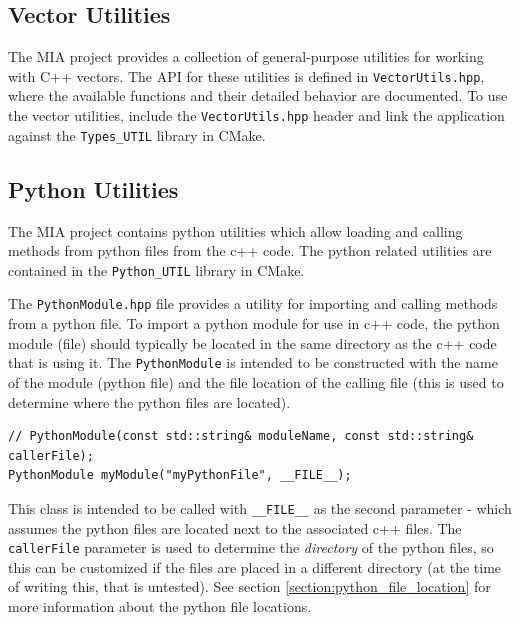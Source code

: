 \subsection{Vector Utilities}\label{section:vector_utils}

The MIA project provides a collection of general-purpose utilities for working with C++ vectors. The API for these utilities is defined in \texttt{VectorUtils.hpp}, where the available functions and their detailed behavior are documented. To use the vector utilities, include the \texttt{VectorUtils.hpp} header and link the application against the \texttt{Types\_UTIL} library in CMake.
















\subsection{Python Utilities}\label{section:python_utils}

The MIA project contains python utilities which allow loading and calling methods from python files from the c++ code. The python related utilities are contained in the \texttt{Python\_UTIL} library in CMake.

The \texttt{PythonModule.hpp} file provides a utility for importing and calling methods from a python file. To import a python module for use in c++ code, the python module (file) should typically be located in the same directory as the c++ code that is using it. The \texttt{PythonModule} is intended to be constructed with the name of the module (python file) and the file location of the calling file (this is used to determine where the python files are located).
\begin{lstlisting}[style=cppstyle]
// PythonModule(const std::string& moduleName, const std::string& callerFile);
PythonModule myModule("myPythonFile", __FILE__);
\end{lstlisting}
This class is intended to be called with \texttt{\_\_FILE\_\_} as the second parameter - which assumes the python files are located next to the associated c++ files. The \texttt{callerFile} parameter is used to determine the \textit{directory} of the python files, so this can be customized if the files are placed in a different directory (at the time of writing this, that is untested). See section \ref{section:python_file_location} for more information about the python file locations. 

